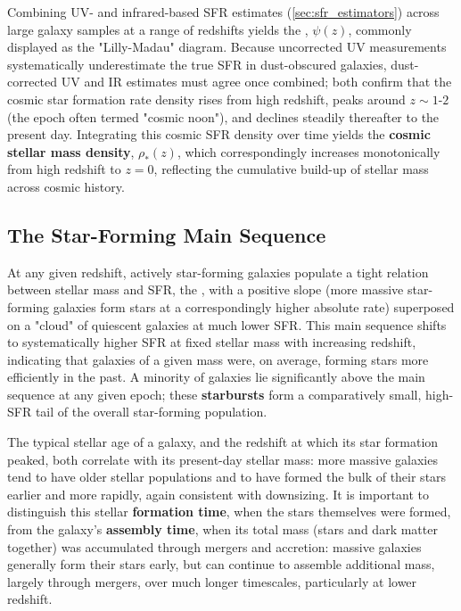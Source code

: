 Combining UV- and infrared-based SFR estimates (\cref{sec:sfr_estimators}) across large galaxy samples at a range of redshifts yields the , $\psi(z)$, commonly displayed as the "Lilly-Madau" diagram. Because uncorrected UV measurements systematically underestimate the true SFR in dust-obscured galaxies, dust-corrected UV and IR estimates must agree once combined; both confirm that the cosmic star formation rate density rises from high redshift, peaks around $z \sim 1$-$2$ (the epoch often termed "cosmic noon"), and declines steadily thereafter to the present day. Integrating this cosmic SFR density over time yields the \textbf{cosmic stellar mass density}, $\rho_*(z)$, which correspondingly increases monotonically from high redshift to $z=0$, reflecting the cumulative build-up of stellar mass across cosmic history.

\subsection{The Star-Forming Main Sequence} \label{subsec:main_sequence}

At any given redshift, actively star-forming galaxies populate a tight relation between stellar mass and SFR, the , with a positive slope (more massive star-forming galaxies form stars at a correspondingly higher absolute rate) superposed on a "cloud" of quiescent galaxies at much lower SFR. This main sequence shifts to systematically higher SFR at fixed stellar mass with increasing redshift, indicating that galaxies of a given mass were, on average, forming stars more efficiently in the past. A minority of galaxies lie significantly above the main sequence at any given epoch; these \textbf{starbursts} form a comparatively small, high-SFR tail of the overall star-forming population.

\medskip

The typical stellar age of a galaxy, and the redshift at which its star formation peaked, both correlate with its present-day stellar mass: more massive galaxies tend to have older stellar populations and to have formed the bulk of their stars earlier and more rapidly, again consistent with downsizing. It is important to distinguish this stellar \textbf{formation time}, when the stars themselves were formed, from the galaxy's \textbf{assembly time}, when its total mass (stars and dark matter together) was accumulated through mergers and accretion: massive galaxies generally form their stars early, but can continue to assemble additional mass, largely through mergers, over much longer timescales, particularly at lower redshift.


